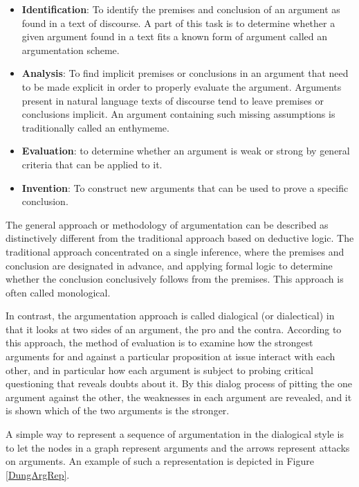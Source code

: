 \documentclass[sigconf]{acmart}
\begin{document}
\begin{itemize}
  \item \textbf{Identification}: To identify the premises and conclusion of an argument as found in a text of discourse. A part of this task is to determine whether a given argument found in a text fits a known form of argument called an argumentation scheme. 

  \item \textbf{Analysis}: To find implicit premises or conclusions in an argument that need to be made explicit in order to properly evaluate the argument. Arguments present in natural language texts of discourse tend to leave premises or conclusions implicit. An argument containing such missing assumptions is traditionally called an enthymeme. 
  
  \item \textbf{Evaluation}: to determine whether an argument is weak or strong by general criteria that can be applied to it.

  \item \textbf{Invention}: To construct new arguments that can be used to prove a specific conclusion.
\end{itemize}

The general approach or methodology of argumentation can be described as distinctively different from the traditional approach based on deductive logic. The traditional approach concentrated on a single inference, where the premises and conclusion are designated in advance, and applying formal logic to determine whether the conclusion conclusively follows from the premises. This approach is often called monological.

In contrast, the argumentation approach is called dialogical (or dialectical) in that it looks at two sides of an argument, the pro and the contra. According to this approach, the method of evaluation is to examine how the strongest arguments for and against a particular proposition at issue interact with each other, and in particular how each argument is subject to probing critical questioning that reveals doubts about it. By this dialog process of pitting the one argument against the other, the weaknesses in each argument are revealed, and it is shown which of the two arguments is the stronger.\cite{rahwan2009argumentation}

A simple way to represent a sequence of argumentation in the dialogical style is to let the nodes in a graph represent arguments and the arrows represent attacks on arguments. An example of such a representation is depicted in Figure \ref{DungArgRep}.
\end{document}
